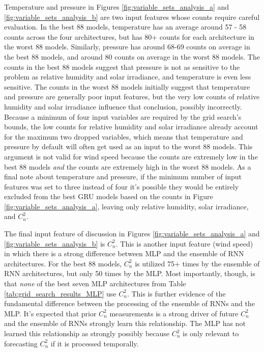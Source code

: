 Temperature and pressure in Figures \ref{fig:variable_sets_analysis_a} and \ref{fig:variable_sets_analysis_b} are two input features whose counts require careful evaluation. In the best 88 models, temperature has an average around 57 - 58 counts across the four architectures, but has 80+ counts for each architecture in the worst 88 models. Similarly, pressure has around 68-69 counts on average in the best 88 models, and around 80 counts on average in the worst 88 models. The counts in the best 88 models suggest that pressure is not as sensitive to the problem as relative humidity and solar irradiance, and temperature is even less sensitive. The counts in the worst 88 models initially suggest that temperature and pressure are generally poor input features, but the very low counts of relative humidity and solar irradiance influence that conclusion, possibly incorrectly. Because a minimum of four input variables are required by the grid search's bounds, the low counts for relative humidity and solar irradiance already account for the maximum two dropped variables, which means that temperature and pressure by default will often get used as an input to the worst 88 models. This argument is not valid for wind speed because the counts are extremely low in the best 88 models \emph{and} the counts are extremely high in the worst 88 models. As a final note about temperature and pressure, if the minimum number of input features was set to three instead of four it's possible they would be entirely excluded from the best GRU models based on the counts in Figure \ref{fig:variable_sets_analysis_a}, leaving only relative humidity, solar irradiance, and $C_{n}^{2}$. 

The final input feature of discussion in Figures \ref{fig:variable_sets_analysis_a} and \ref{fig:variable_sets_analysis_b} is $C_{n}^{2}$. This is another input feature (wind speed) in which there is a strong difference between MLP and the ensemble of RNN architectures. For the best 88 models, $C_{n}^{2}$ is utilized 75+ times by the ensemble of RNN architectures, but only 50 times by the MLP. Most importantly, though, is that \emph{none} of the best seven MLP architectures from Table \ref{tab:grid_search_results_MLP} use $C_{n}^{2}$. This is further evidence of the fundamental difference between the processing of the ensemble of RNNs and the MLP. It's expected that prior $C_{n}^{2}$ measurements is a strong driver of future $C_{n}^{2}$ and the ensemble of RNNs strongly learn this relationship. The MLP has not learned this relationship as strongly possibly because $C_{n}^{2}$ is only relevant to forecasting $C_{n}^{2}$ if it is processed temporally.

